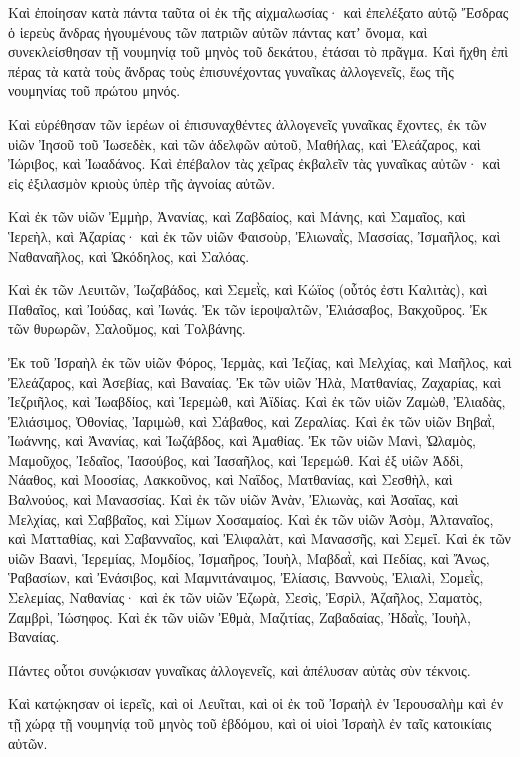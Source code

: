 {Καὶ ἐποίησαν κατὰ πάντα ταῦτα οἱ ἐκ τῆς αἰχμαλωσίας·
καὶ ἐπελέξατο αὐτῷ Ἔσδρας ὁ ἱερεὺς ἄνδρας ἡγουμένους τῶν πατριῶν αὐτῶν πάντας κατʼ ὄνομα, καὶ συνεκλείσθησαν τῇ νουμηνίᾳ τοῦ μηνὸς τοῦ δεκάτου, ἐτάσαι τὸ πρᾶγμα.
Καὶ ἤχθη ἐπὶ πέρας τὰ κατὰ τοὺς ἄνδρας τοὺς ἐπισυνέχοντας γυναῖκας ἀλλογενεῖς, ἕως τῆς νουμηνίας τοῦ πρώτου μηνός.
\par }{\PP {}Καὶ εὑρέθησαν τῶν ἱερέων οἱ ἐπισυναχθέντες ἀλλογενεῖς γυναῖκας ἔχοντες,
ἐκ τῶν υἱῶν Ἰησοῦ τοῦ Ἰωσεδὲκ, καὶ τῶν ἀδελφῶν αὐτοῦ, Μαθήλας, καὶ Ἐλεάζαρος, καὶ Ἰώριβος, καὶ Ἰωαδάνος.
Καὶ ἐπέβαλον τὰς χεῖρας ἐκβαλεῖν τὰς γυναῖκας αὐτῶν· καὶ εἰς ἐξιλασμὸν κριοὺς ὑπὲρ τῆς ἀγνοίας αὐτῶν.
\par }{\PP {}Καὶ ἐκ τῶν υἱῶν Ἐμμὴρ, Ἀνανίας, καὶ Ζαβδαίος, καὶ Μάνης, καὶ Σαμαῖος, καὶ Ἱερεὴλ, καὶ Ἀζαρίας·
καὶ ἐκ τῶν υἱῶν Φαισοὺρ, Ἐλιωναῒς, Μασσίας, Ἰσμαῆλος, καὶ Ναθαναῆλος, καὶ Ὠκόδηλος, καὶ Σαλόας.
\par }{\PP {}Καὶ ἐκ τῶν Λευιτῶν, Ἰωζαβάδος, καὶ Σεμεῒς, καὶ Κώϊος (οὗτός ἐστι Καλιτὰς), καὶ Παθαῖος, καὶ Ἰούδας, καὶ Ἰωνάς.
Ἐκ τῶν ἱεροψαλτῶν, Ἐλιάσαβος, Βακχοῦρος.
Ἐκ τῶν θυρωρῶν, Σαλοῦμος, καὶ Τολβάνης.
\par }{\PP {}Ἐκ τοῦ Ἰσραὴλ ἐκ τῶν υἱῶν Φόρος, Ἱερμὰς, καὶ Ἰεζίας, καὶ Μελχίας, καὶ Μαῆλος, καὶ Ἐλεάζαρος, καὶ Ἀσεβίας, καὶ Βαναίας.
Ἐκ τῶν υἱῶν Ἠλὰ, Ματθανίας, Ζαχαρίας, καὶ Ἰεζριῆλος, καὶ Ἰωαβδίος, καὶ Ἱερεμὼθ, καὶ Ἀϊδίας.
Καὶ ἐκ τῶν υἱῶν Ζαμὼθ, Ἐλιαδὰς, Ἐλιάσιμος, Ὀθονίας, Ἰαριμὼθ, καὶ Σάβαθος, καὶ Ζεραλίας.
Καὶ ἐκ τῶν υἱῶν Βηβαῒ, Ἰωάννης, καὶ Ἀνανίας, καὶ Ἰωζάβδος, καὶ Ἀμαθίας.
Ἐκ τῶν υἱῶν Μανὶ, Ὠλαμὸς, Μαμοῦχος, Ἰεδαῖος, Ἰασούβος, καὶ Ἰασαῆλος, καὶ Ἱερεμώθ.
Καὶ ἐξ υἱῶν Ἀδδὶ, Νάαθος, καὶ Μοοσίας, Λακκοῦνος, καὶ Ναΐδος, Ματθανίας, καὶ Σεσθὴλ, καὶ Βαλνούος, καὶ Μανασσίας.
Καὶ ἐκ τῶν υἱῶν Ἀνὰν, Ἐλιωνὰς, καὶ Ἀσαΐας, καὶ Μελχίας, καὶ Σαββαῖος, καὶ Σίμων Χοσαμαίος.
Καὶ ἐκ τῶν υἱῶν Ἀσὸμ, Ἀλταναῖος, καὶ Ματταθίας, καὶ Σαβανναῖος, καὶ Ἐλιφαλὰτ, καὶ Μανασσῆς, καὶ Σεμεΐ.
Καὶ ἐκ τῶν υἱῶν Βαανὶ, Ἱερεμίας, Μομδίος, Ἰσμαῆρος, Ἰουὴλ, Μαβδαῒ, καὶ Πεδίας, καὶ Ἄνως, Ῥαβασίων, καὶ Ἐνάσιβος, καὶ Μαμνιτάναιμος, Ἐλίασις, Βαννοὺς, Ἐλιαλὶ, Σομεῒς, Σελεμίας, Ναθανίας· καὶ ἐκ τῶν υἱῶν Ἐζωρὰ, Σεσὶς, Ἐσρὶλ, Ἀζαῆλος, Σαματὸς, Ζαμβρὶ, Ἰώσηφος.
Καὶ ἐκ τῶν υἱῶν Ἐθμὰ, Μαζιτίας, Ζαβαδαίας, Ἠδαῒς, Ἰουὴλ, Βαναίας.
\par }{\PP {}Πάντες οὗτοι συνῴκισαν γυναῖκας ἀλλογενεῖς, καὶ ἀπέλυσαν αὐτὰς σὺν τέκνοις.
\par }{\PP {}Καὶ κατῴκησαν οἱ ἱερεῖς, καὶ οἱ Λευῖται, καὶ οἱ ἐκ τοῦ Ἰσραὴλ ἐν Ἱερουσαλὴμ καὶ ἐν τῇ χώρᾳ τῇ νουμηνίᾳ τοῦ μηνὸς τοῦ ἑβδόμου, καὶ οἱ υἱοὶ Ἰσραὴλ ἐν ταῖς κατοικίαις αὐτῶν.
}
